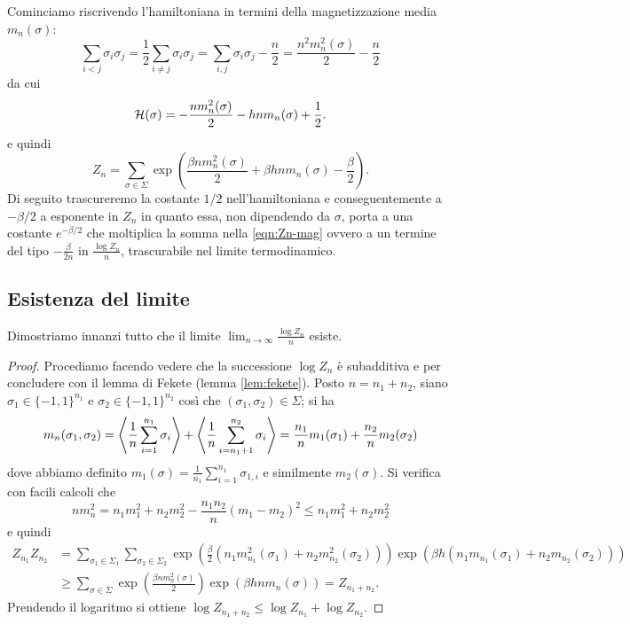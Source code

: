 Cominciamo riscrivendo l'hamiltoniana in termini della magnetizzazione media $ m_n(\sigma) $:
\[ \sum_{i<j} \sigma_i \sigma_j = \frac{1}{2} \sum_{i \neq j} \sigma_i \sigma_j = \sum_{i,j} \sigma_i \sigma_j -\frac{n}{2} = \frac{n^2 m_n^2(\sigma)}{2} - \frac{n}{2} \]
da cui
\begin{equation}
    \mathcal{H}(\sigma) = -\frac{n m_n^2(\sigma)}{2} - hnm_n(\sigma) + \frac{1}{2}.
\end{equation}
e quindi
\begin{equation} \label{eqn:Zn-mag}
    Z_n = \sum_{\sigma \in \Sigma} \exp\left( \frac{\beta n m_n^2(\sigma)}{2} + \beta h n m_n(\sigma) - \frac{\beta}{2}\right).
\end{equation}
Di seguito trascureremo la costante $ 1/2 $ nell'hamiltoniana e conseguentemente a $ -\beta/2 $ a esponente in $ Z_n $ in quanto essa, non dipendendo da $ \sigma $, porta a una costante $ e^{-\beta/2} $ che moltiplica la somma nella \eqref{eqn:Zn-mag} ovvero a un termine del tipo $ -\frac{\beta}{2n} $ in $ \frac{\log Z_n}{n} $, trascurabile nel limite termodinamico.

\subsection{Esistenza del limite}
Dimostriamo innanzi tutto che il limite $ \lim_{n\to\infty} \frac{\log Z_n}{n} $ esiste.
\begin{proof}
    Procediamo facendo vedere che la successione $ \log Z_n $ è subadditiva e per concludere con il lemma di Fekete (lemma \ref{lem:fekete}).
    Posto $ n = n_1 + n_2 $, siano $ \sigma_1 \in \{-1,1\}^{n_1} $ e $ \sigma_2 \in \{-1,1\}^{n_2} $ così che $ (\sigma_1, \sigma_2) \in \Sigma $; si ha
    \[ m_n(\sigma_1,\sigma_2) = \left< \frac{1}{n} \sum_{i=1}^{n_1} \sigma_i \right> + \left< \frac{1}{n} \sum_{i=n_1 + 1}^{n_2} \sigma_i \right> = \frac{n_1}{n} m_1(\sigma_1) + \frac{n_2}{n} m_2(\sigma_2) \]
    dove abbiamo definito $ m_1(\sigma) = \frac{1}{n_1} \sum_{i=1}^{n_1}\sigma_{1, i} $ e similmente $ m_2(\sigma) $. Si verifica con facili calcoli che
    \[ n m_n^2 = n_1 m_1^2 + n_2 m_2^2 - \frac{n_1 n_2}{n} (m_1-m_2)^2 \leq n_1 m_1^2 + n_2 m_2^2 \]
    e quindi
    \begin{align*}
        Z_{n_1} Z_{n_2} & = \sum_{\sigma_1\in\Sigma_1} \sum_{\sigma_2\in\Sigma_2} \exp\left(\frac{\beta}{2} \left(n_1 m_{n_1}^2(\sigma_1) + n_2 m_{n_2}^2(\sigma_2) \right) \right) \exp\left(\beta h\left(n_1 m_{n_1}(\sigma_1) + n_2 m_{n_2}(\sigma_2) \right) \right) \\
                        & \geq \sum_{\sigma\in\Sigma} \exp\left(\frac{\beta n m_n^2(\sigma)}{2} \right) \exp\left(\beta h n m_n(\sigma) \right) = Z_{n_1+n_2}.
    \end{align*}
    Prendendo il logaritmo si ottiene $ \log Z_{n_1+n_2} \leq \log Z_{n_1} + \log Z_{n_2} $.
\end{proof}


